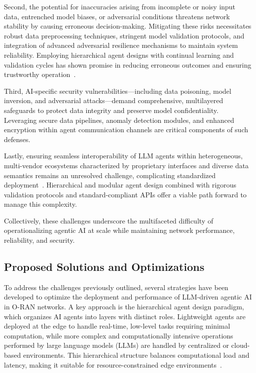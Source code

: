\documentclass[sigconf]{acmart}
\begin{document}
Second, the potential for inaccuracies arising from incomplete or noisy input data, entrenched model biases, or adversarial conditions threatens network stability by causing erroneous decision-making. Mitigating these risks necessitates robust data preprocessing techniques, stringent model validation protocols, and integration of advanced adversarial resilience mechanisms to maintain system reliability. Employing hierarchical agent designs with continual learning and validation cycles has shown promise in reducing erroneous outcomes and ensuring trustworthy operation~\cite{ref55}.

Third, AI-specific security vulnerabilities—including data poisoning, model inversion, and adversarial attacks—demand comprehensive, multilayered safeguards to protect data integrity and preserve model confidentiality. Leveraging secure data pipelines, anomaly detection modules, and enhanced encryption within agent communication channels are critical components of such defenses.

Lastly, ensuring seamless interoperability of LLM agents within heterogeneous, multi-vendor ecosystems characterized by proprietary interfaces and diverse data semantics remains an unresolved challenge, complicating standardized deployment~\cite{ref55,ref48}. Hierarchical and modular agent design combined with rigorous validation protocols and standard-compliant APIs offer a viable path forward to manage this complexity.

Collectively, these challenges underscore the multifaceted difficulty of operationalizing agentic AI at scale while maintaining network performance, reliability, and security.

\subsection{Proposed Solutions and Optimizations}

To address the challenges previously outlined, several strategies have been developed to optimize the deployment and performance of LLM-driven agentic AI in O-RAN networks. A key approach is the hierarchical agent design paradigm, which organizes AI agents into layers with distinct roles. Lightweight agents are deployed at the edge to handle real-time, low-level tasks requiring minimal computation, while more complex and computationally intensive operations performed by large language models (LLMs) are handled by centralized or cloud-based environments. This hierarchical structure balances computational load and latency, making it suitable for resource-constrained edge environments~\cite{ref55}.
\end{document}
